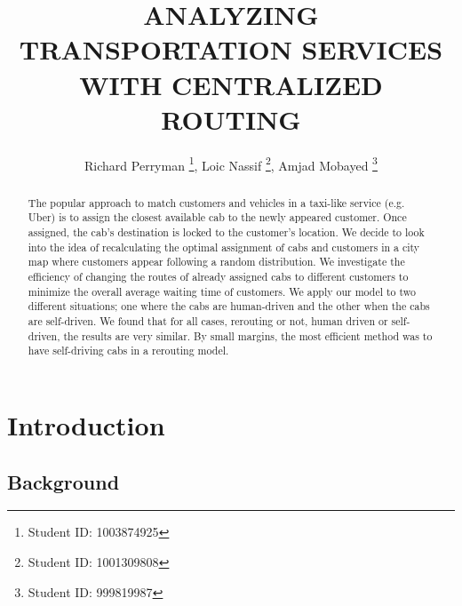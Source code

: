 \documentclass[Proceedings]{ascelike}
\begin{document}
%
\title{ANALYZING TRANSPORTATION SERVICES WITH CENTRALIZED ROUTING}
%
\author{
Richard Perryman
\thanks{Student ID: 1003874925},
Loic Nassif
\thanks{Student ID: 1001309808},
Amjad Mobayed
\thanks{Student ID: 999819987}
}
%
\maketitle
%
\begin{abstract}
The popular approach to match customers and vehicles in a taxi-like service (e.g. Uber) is to assign the closest available cab to the newly appeared customer. Once assigned, the cab's destination is locked to the customer's location. We decide to look into the idea of recalculating the optimal assignment of cabs and customers in a city map where customers appear following a random distribution. We investigate the efficiency of changing the routes of already assigned cabs to different customers to minimize the overall average waiting time of customers. We apply our model to two different situations; one where the cabs are human-driven and the other when the cabs are self-driven. We found that for all cases, rerouting or not, human driven or self-driven, the results are very similar. By small margins, the most efficient method was to have self-driving cabs in a rerouting model.
\end{abstract}
%
%
%

\newpage

\section*{Introduction}

\subsection*{Background}
\end{document}
